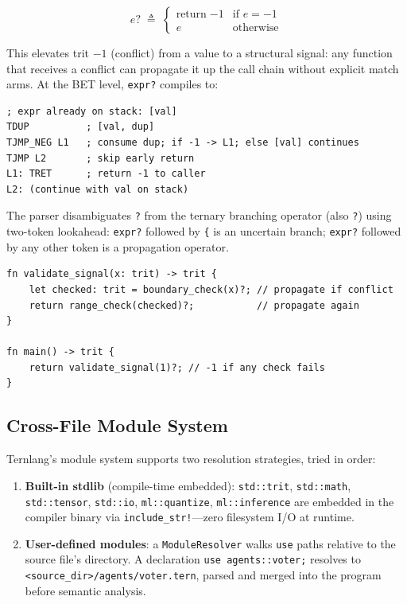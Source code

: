 \documentclass[journal,10pt,twocolumn]{IEEEtran}
\begin{document}
\begin{equation}
  e\texttt{?} \;\triangleq\;
  \begin{cases}
    \text{return}\;{-1} & \text{if } e = {-1} \\
    e                   & \text{otherwise}
  \end{cases}
  \label{eq:propagate}
\end{equation}

This elevates trit $-1$ (conflict) from a value to a structural signal: any
function that receives a conflict can propagate it up the call chain without
explicit match arms. At the BET level, \texttt{expr?} compiles to:

\begin{lstlisting}[caption={BET bytecode for \texttt{expr?}}]
; expr already on stack: [val]
TDUP          ; [val, dup]
TJMP_NEG L1   ; consume dup; if -1 -> L1; else [val] continues
TJMP L2       ; skip early return
L1: TRET      ; return -1 to caller
L2: (continue with val on stack)
\end{lstlisting}

The parser disambiguates \texttt{?} from the ternary branching operator
(also \texttt{?}) using two-token lookahead: \texttt{expr?} followed by
\texttt{\{} is an uncertain branch; \texttt{expr?} followed by any other
token is a propagation operator.

\begin{lstlisting}[caption={Error propagation in a validation chain}]
fn validate_signal(x: trit) -> trit {
    let checked: trit = boundary_check(x)?; // propagate if conflict
    return range_check(checked)?;           // propagate again
}

fn main() -> trit {
    return validate_signal(1)?; // -1 if any check fails
}
\end{lstlisting}

\subsection{Cross-File Module System}
\label{subsec:modules}

Ternlang's module system supports two resolution strategies, tried in order:

\begin{enumerate}
  \item \textbf{Built-in stdlib} (compile-time embedded): \texttt{std::trit},
        \texttt{std::math}, \texttt{std::tensor}, \texttt{std::io},
        \texttt{ml::quantize}, \texttt{ml::inference} are embedded in the
        compiler binary via \texttt{include\_str!}—zero filesystem I/O at
        runtime.
  \item \textbf{User-defined modules}: a \texttt{ModuleResolver} walks
        \texttt{use} paths relative to the source file's directory. A
        declaration \texttt{use agents::voter;} resolves to
        \texttt{<source\_dir>/agents/voter.tern}, parsed and merged into
        the program before semantic analysis.
\end{enumerate}
\end{document}
